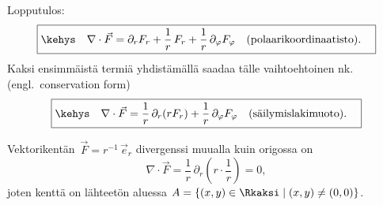 Lopputulos:
\[
\boxed{\kehys\quad \nabla\cdot\vec F = \partial_r F_r + \dfrac{1}{r}\,F_r
                                       + \frac{1}{r}\,\partial_\varphi F_\varphi \quad
                                         \text{(polaarikoordinaatisto)}. \quad}
\]
Kaksi ensimmäistä termiä yhdistämällä saadaa tälle vaihtoehtoinen nk.\ 
(engl.\ conservation form) 
\[
\boxed{\kehys\quad \nabla\cdot\vec F = \dfrac{1}{r}\,\partial_r(rF_r)
                                       +\frac{1}{r}\,\partial_\varphi F_\varphi \quad
                                        \text{(säilymislakimuoto)}. \quad}
\]
\begin{Exa} Vektorikentän $\,\vec F=r^{-1}\,\vec e_r$ divergenssi muualla kuin origossa on
\[
\nabla\cdot\vec F = \frac{1}{r}\,\partial_r\left(r\cdot\frac{1}{r}\right)=0,
\]
joten kenttä on lähteetön aluessa $A=\{(x,y)\in\Rkaksi \mid (x,y) \neq (0,0)\}$. \loppu
\end{Exa}

